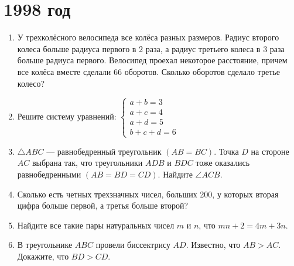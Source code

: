 \documentclass[12pt]{article}
\begin{document}
\section* {1998 год}
\begin{enumerate}
    \item У трехколёсного велосипеда все колёса разных размеров. Радиус второго колеса больше радиуса первого в 2 раза, а радиус третьего колеса
        в 3 раза больше радиуса первого. Велосипед проехал некоторое расстояние,
        причем все колёса вместе сделали 66 оборотов. Сколько оборотов сделало
        третье колесо? 
    \item Решите систему уравнений:
        $
        \begin{cases}
            a + b = 3\\
            a + c = 4\\
            a + d = 5\\
            b + c + d = 6
        \end{cases}
        $
    \item $\triangle ABC$ --- равнобедренный треугольник $(AB = BC)$. Точка $D$ на стороне $AC$ выбрана так, что треугольники $ADB$ и $BDC$ тоже оказались равнобедренными $(AB = BD = CD)$. Найдите $\angle ACB$.
    \item Сколько есть четных трехзначных чисел, больших 200, у которых вторая цифра больше первой, а третья \textemdash{} больше второй?
    \item Найдите все такие пары натуральных чисел $m$ и $n$, что $mn + 2 = 4m + 3n$.
    \item В треугольнике $ABC$ провели биссектрису $AD$. Известно, что $AB > AC$. Докажите, что $BD > CD$.
\end{enumerate}
\end{document}

